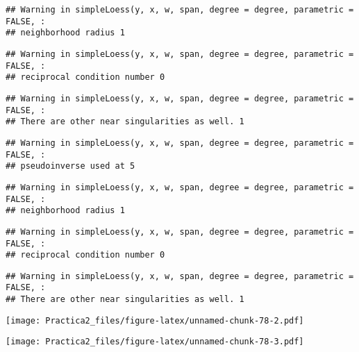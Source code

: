\documentclass[
]{article}
\newenvironment{Shaded}{\begin{snugshade}}{\end{snugshade}}
\newcommand{\FunctionTok}[1]{\textcolor[rgb]{0.00,0.00,0.00}{#1}}
\newcommand{\NormalTok}[1]{#1}
\newcommand{\SpecialCharTok}[1]{\textcolor[rgb]{0.00,0.00,0.00}{#1}}
\begin{document}
\begin{verbatim}
## Warning in simpleLoess(y, x, w, span, degree = degree, parametric = FALSE, :
## neighborhood radius 1
\end{verbatim}

\begin{verbatim}
## Warning in simpleLoess(y, x, w, span, degree = degree, parametric = FALSE, :
## reciprocal condition number 0
\end{verbatim}

\begin{verbatim}
## Warning in simpleLoess(y, x, w, span, degree = degree, parametric = FALSE, :
## There are other near singularities as well. 1
\end{verbatim}

\begin{verbatim}
## Warning in simpleLoess(y, x, w, span, degree = degree, parametric = FALSE, :
## pseudoinverse used at 5
\end{verbatim}

\begin{verbatim}
## Warning in simpleLoess(y, x, w, span, degree = degree, parametric = FALSE, :
## neighborhood radius 1
\end{verbatim}

\begin{verbatim}
## Warning in simpleLoess(y, x, w, span, degree = degree, parametric = FALSE, :
## reciprocal condition number 0
\end{verbatim}

\begin{verbatim}
## Warning in simpleLoess(y, x, w, span, degree = degree, parametric = FALSE, :
## There are other near singularities as well. 1
\end{verbatim}

\texttt{[image: Practica2\_files/figure-latex/unnamed-chunk-78-2.pdf]}

\begin{Shaded}
\end{Shaded}

\texttt{[image: Practica2\_files/figure-latex/unnamed-chunk-78-3.pdf]}

\begin{Shaded}
\end{Shaded}
\end{document}
